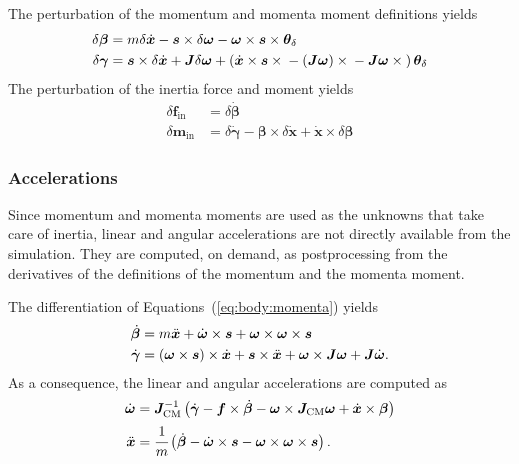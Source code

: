 \documentclass[10pt,dvips,fleqn,subeqn]{report}
\newcommand{\T}[1]{\bm{#1}}
\newcommand{\TT}[1]{\bm{#1}}
\begin{document}
The perturbation of the momentum and momenta moment definitions yields
\begin{subequations}
\begin{align}
	\delta\T{\beta}
	&= m \delta\dot{\T{x}}
	- \T{s}\times\delta\T{\omega}
	- \T{\omega}\times\T{s}\times\T{\theta}_{\delta} \\
	\delta\T{\gamma}
	&=
	\T{s}\times\delta\dot{\T{x}}
	+ \TT{J} \delta\T{\omega}
	+ \plbr{
		\dot{\T{x}}\times\T{s}\times{}
		- \plbr{\TT{J} \T{\omega}}\times{}
		- \TT{J} \T{\omega}\times{}
	}\T{\theta}_{\delta}
\end{align}
\end{subequations}
The perturbation of the inertia force and moment yields
\begin{subequations}
\begin{align}
	\delta\T{f}_{\text{in}}
	&= \delta\dot{\T{\beta}} \\
	\delta\T{m}_{\text{in}}
	&= \delta\dot{\T{\gamma}}
	- \T{\beta}\times\delta\dot{\T{x}}
	+ \dot{\T{x}}\times\delta\T{\beta}
\end{align}
\end{subequations}


\subsubsection{Accelerations}
\label{sec:nodes:structural nodes:dynamic structural nodes:accelerations}
Since momentum and momenta moments are used as the unknowns
that take care of inertia, linear and angular accelerations
are not directly available from the simulation.
They are computed, on demand, as postprocessing from the derivatives
of the definitions of the momentum and the momenta moment.

The differentiation of Equations~(\ref{eq:body:momenta}) yields
\begin{subequations}
\begin{align}
	\dot{\T{\beta}} &= m \ddot{\T{x}} + \dot{\T{\omega}} \times \T{s}
		+ \T{\omega} \times \T{\omega} \times \T{s} \\
	\dot{\T{\gamma}} &= \plbr{\T{\omega}\times \T{s}} \times \dot{\T{x}}
		+ \T{s} \times \ddot{\T{x}}
		+ \T{\omega} \times \TT{J} \T{\omega}
		+ \TT{J} \dot{\T{\omega}} .
\end{align}
\end{subequations}
As a consequence, the linear and angular accelerations are computed as
\begin{align}
	\dot{\T{\omega}}
	&= \TT{J}_{\text{CM}}^{-1} \plbr{
		\dot{\T{\gamma}}
		- \T{f} \times \dot{\T{\beta}}
		- \T{\omega} \times \TT{J}_{\text{CM}} \T{\omega}
		+ \dot{\T{x}} \times \T{\beta}
	} \\
	\ddot{\T{x}}
	&= \cfrac{1}{m}\plbr{
		\dot{\T{\beta}}
		- \dot{\T{\omega}} \times \T{s}
		- \T{\omega} \times \T{\omega} \times \T{s}
	} .
\end{align}
\end{document}
